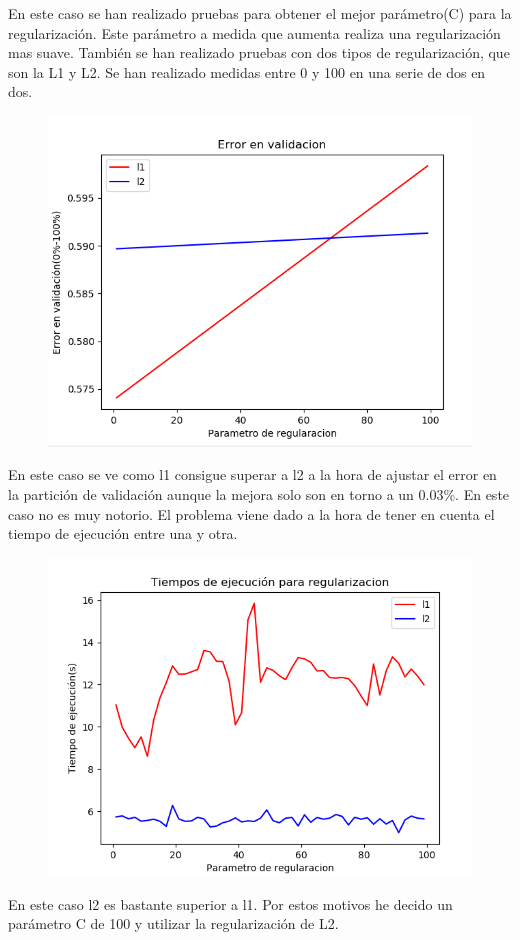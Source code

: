 \documentclass[titlepage]{article}
\begin{document}
	En este caso se han realizado pruebas para obtener el mejor parámetro(C) para la regularización. Este parámetro a medida que aumenta realiza una regularización mas suave. También se han realizado pruebas con dos tipos de regularización, que son la L1 y L2. Se han realizado medidas entre 0 y 100 en una serie de dos en dos.
	
	\begin{figure}[H]
		\centering
		\includegraphics[width=0.7\linewidth]{../imagenesRL/graficaRegularizacion}
		\caption{}
		\label{fig:Grafica de regularizacion}
	\end{figure}

	En este caso se ve como l1 consigue superar a l2 a la hora de ajustar el error en la partición de validación aunque la mejora solo son en torno a un 0.03\%. En este caso no es muy notorio. El problema viene dado a la hora de tener en cuenta el tiempo de ejecución entre una y otra. 
	\begin{figure}[H]
		\centering
		\includegraphics[width=0.7\linewidth]{../imagenesRL/tiemposEjecucion}
		\caption{}
		\label{fig:tiemposejecucion}
	\end{figure}
En este caso l2 es bastante superior a l1. Por estos motivos he decido un parámetro C de 100 y utilizar la regularización de L2.
	
\end{document}
